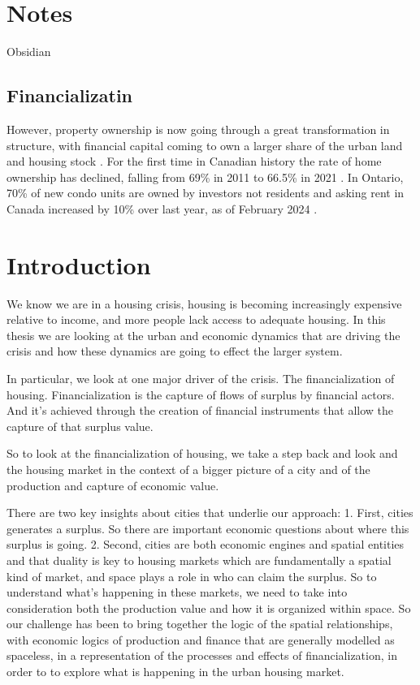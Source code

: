 \documentclass[]{article}
\begin{document}
 
\section{Notes}
Obsidian






\subsection{Financializatin}
However, property ownership is now going through a great transformation in structure, with financial capital coming to own a larger share of the urban land and housing stock \cite{farhaReportFinancializationHousing2017, palleyFinancializationWhatIt2007, ADD_FINANCIALIZATION_BOOK-maybe-tomaskovic-deveyFinancializationCausesInequality2013}. For the first time in Canadian history the rate of home ownership has declined, falling from 69\%  in 2011 to 66.5\% in 2021 \cite{statisticscanadaBuyRentHousing2022}. %
In Ontario, 70\% of new condo units are owned by investors not residents \cite{pickelInvestorsOwn772023} and asking rent in Canada increased by 10\% over last year, as of February 2024 \cite{urbanationNationalRentReport2024}. 

\section{Introduction}
We know we are in a housing crisis, housing is becoming increasingly expensive relative to income, and more people lack access to adequate housing. In this thesis we are looking at the urban and economic dynamics that are driving the crisis and how these dynamics are going to effect the larger system.

In particular, we look at one major driver of the crisis. The financialization of housing. Financialization is the capture of flows of surplus by financial actors. And it's achieved through the creation of financial instruments that allow the capture of that surplus value. 

So to look at the financialization of housing,  we take a step back and look and the housing market in the context of a bigger picture of a city and of the production and capture of economic value.

There are two key insights about cities that underlie our approach: 
1. First, cities generates a surplus. So there are important economic questions about where this surplus is going. 
2. Second, cities are both economic engines and spatial entities and that duality is key to housing markets which are fundamentally a spatial kind of market, and space plays a role in who can claim the surplus. So to understand what's happening in these markets, we need to take into consideration both the production value and how it is organized within space. 
So our challenge has been to bring together the logic of the spatial relationships,  with economic logics of production and finance that are generally modelled as spaceless,  in a representation of the processes and effects of  financialization, in order to to explore what is happening in the urban housing market. %
\end{document}
